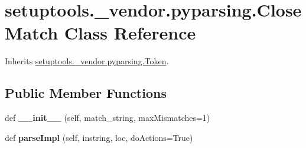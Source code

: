 \hypertarget{classsetuptools_1_1__vendor_1_1pyparsing_1_1_close_match}{}\section{setuptools.\+\_\+vendor.\+pyparsing.\+Close\+Match Class Reference}
\label{classsetuptools_1_1__vendor_1_1pyparsing_1_1_close_match}


Inherits \hyperlink{classsetuptools_1_1__vendor_1_1pyparsing_1_1_token}{setuptools.\+\_\+vendor.\+pyparsing.\+Token}.

\subsection*{Public Member Functions}
\begin{DoxyCompactItemize}
\item 
\mbox{\label{classsetuptools_1_1__vendor_1_1pyparsing_1_1_close_match_a695aa0fa9f33e51b1ee9495ddb5b052d}} 
def {\bfseries \+\_\+\+\_\+init\+\_\+\+\_\+} (self, match\+\_\+string, max\+Mismatches=1)
\item 
\mbox{\label{classsetuptools_1_1__vendor_1_1pyparsing_1_1_close_match_aacb6d178aee9e76f14048c640f82f23a}} 
def {\bfseries parse\+Impl} (self, instring, loc, do\+Actions=True)
\end{DoxyCompactItemize}
